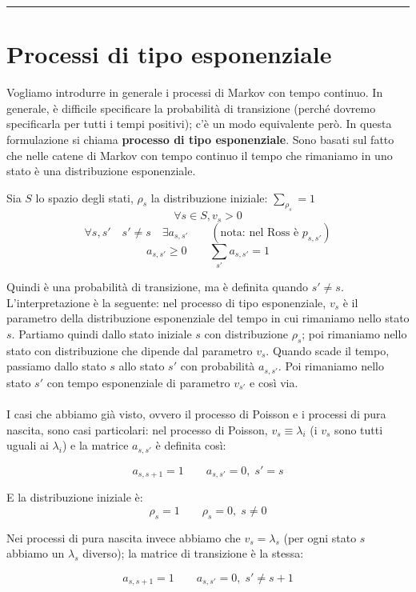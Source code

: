 \documentclass[a4paper,12pt]{book}
\begin{document}
 \vspace{1cm}
 \hrule
 \vspace{1cm}

\section{Processi di tipo esponenziale}
 Vogliamo introdurre in generale i processi di Markov con tempo continuo. In generale, è difficile specificare la probabilità di transizione (perché  dovremo specificarla per tutti i tempi positivi); c'è un modo equivalente però. In questa formulazione si chiama \textbf{processo di tipo esponenziale}. Sono basati sul fatto che nelle catene di Markov con tempo continuo il tempo che rimaniamo in uno stato è una distribuzione esponenziale. 
 
 Sia $ S $ lo spazio degli stati, $ \rho_s $ la distribuzione iniziale: $ \sum_{\rho_s} = 1 $
 $$ \forall s \in S, v_s > 0 $$
 $$ \forall s,s' \quad s' \ne s \quad \exists a_{s,s'} \qquad (\text{nota: nel Ross è } p_{s,s'}) $$
 $$ a_{s,s'} \ge 0 \qquad \sum_{s'} a_{s,s'} = 1 $$

Quindi è una probabilità di transizione, ma è definita quando $ s' \ne s $. L'interpretazione è la seguente: nel processo di tipo esponenziale, $ v_s $ è il parametro della distribuzione esponenziale del tempo in cui rimaniamo nello stato $ s $. Partiamo quindi dallo stato iniziale $ s $ con distribuzione $\rho_s$; poi rimaniamo nello stato con distribuzione che dipende dal parametro $ v_s $. Quando scade il tempo, passiamo dallo stato $ s $ allo stato $ s' $ con probabilità $ a_{s,s'} $. Poi rimaniamo nello stato $ s' $ con tempo esponenziale di parametro $ v_{s'} $ e così via. \\
\\
I casi che abbiamo già visto, ovvero il processo di Poisson e i processi di pura nascita, sono casi particolari: nel processo di Poisson, $ v_s \equiv \lambda_{i} $ (i $ v_s $ sono tutti uguali ai $\lambda_{i}$) e la matrice $ a_{s,s'} $ è definita così:

$$ a_{s,s+1} = 1 \qquad a_{s,s'} = 0, \; s' = s $$ %

E la distribuzione iniziale è: 
$$ \rho_s = 1 \qquad \rho_s = 0, \; s \ne 0 $$ 

Nei processi di pura nascita invece abbiamo che $ v_s = \lambda_ s $ (per ogni stato $ s $ abbiamo un $\lambda_{s}$ diverso); la matrice di transizione è la stessa:

$$ a_{s,s+1} = 1 \qquad a_{s,s'} = 0, \; s' \ne s+1 $$ 
\end{document}
